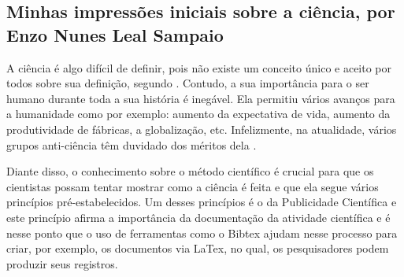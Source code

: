 \subsection{Minhas impressões iniciais sobre a ciência, por Enzo Nunes Leal Sampaio}

A ciência é algo difícil de definir, pois não existe um conceito único e aceito por todos sobre sua definição, segundo \citet{schwartzman_ciencia_1984}. Contudo, a sua importância para o ser humano durante toda a sua história é inegável. Ela permitiu vários avanços para a humanidade como por exemplo: aumento da expectativa de vida, aumento da produtividade de fábricas, a globalização, etc. Infelizmente, na atualidade, vários grupos anti-ciência têm duvidado dos méritos dela \citet{scherma_relatos_2020}.

Diante disso, o conhecimento sobre o método científico é crucial para que os cientistas possam tentar mostrar como a ciência é feita e que ela segue vários princípios pré-estabelecidos. Um desses princípios é o da Publicidade Científica e este princípio afirma a importância da documentação da atividade científica e é nesse ponto que o uso de ferramentas como o \gls{Bibtex} ajudam nesse processo para criar, por exemplo, os documentos via LaTex, no qual, os pesquisadores podem produzir seus registros.